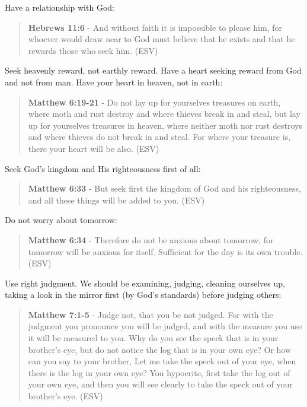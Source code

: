 \documentclass[11pt]{article}
\begin{document}
Have a relationship with God:

\begin{quote}
\textbf{Hebrews 11:6} - And without faith it is impossible to please him, for whoever would draw near to God must believe that he exists and that he rewards those who seek him. (ESV)
\end{quote}

Seek heavenly reward, not earthly reward. Have a heart seeking reward from God and not from man. Have your heart in heaven, not in earth:

\begin{quote}
\textbf{Matthew 6:19-21} - Do not lay up for yourselves treasures on earth, where moth and rust destroy and where thieves break in and steal, but lay up for yourselves treasures in heaven, where neither moth nor rust destroys and where thieves do not break in and steal. For where your treasure is, there your heart will be also. (ESV)
\end{quote}

Seek God's kingdom and His righteousness first of all:

\begin{quote}
\textbf{Matthew 6:33} - But seek first the kingdom of God and his righteousness, and all these things will be added to you. (ESV)
\end{quote}

Do not worry about tomorrow:

\begin{quote}
\textbf{Matthew 6:34} - Therefore do not be anxious about tomorrow, for tomorrow will be anxious for itself. Sufficient for the day is its own trouble. (ESV)
\end{quote}

Use right judgment. We should be examining, judging, cleaning ourselves up, taking a look in the mirror first (by God's standards) before judging others:

\begin{quote}
\textbf{Matthew 7:1-5} - Judge not, that you be not judged. For with the judgment you pronounce you will be judged, and with the measure you use it will be measured to you. Why do you see the speck that is in your brother's eye, but do not notice the log that is in your own eye? Or how can you say to your brother, Let me take the speck out of your eye, when there is the log in your own eye? You hypocrite, first take the log out of your own eye, and then you will see clearly to take the speck out of your brother's eye. (ESV)
\end{quote}
\end{document}
